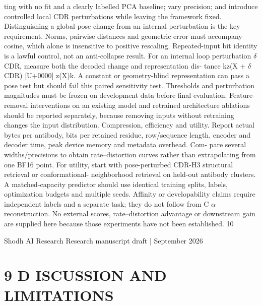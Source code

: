 \documentclass[11pt]{article}
\begin{document}
ting with no fit and a clearly labelled PCA baseline; vary precision; and introduce controlled local
CDR perturbations while leaving the framework fixed. Distinguishing a global pose change from
an internal perturbation is the key requirement. Norms, pairwise distances and geometric error must
accompany cosine, which alone is insensitive to positive rescaling. Repeated-input bit identity is a
lawful control, not an anti-collapse result.
For an internal loop perturbation \ensuremath{\delta}CDR, measure both the decoded change and representation dis-
tance kz(X + \ensuremath{\delta}CDR) [U+0000] z(X)k. A constant or geometry-blind representation can pass a pose test
but should fail this paired sensitivity test. Thresholds and perturbation magnitudes must be frozen
on development data before final evaluation. Feature-removal interventions on an existing model
and retrained architecture ablations should be reported separately, because removing inputs without
retraining changes the input distribution.
Compression, efficiency and utility. Report actual bytes per antibody, bits per retained residue,
row/sequence length, encoder and decoder time, peak device memory and metadata overhead. Com-
pare several widths/precisions to obtain rate–distortion curves rather than extrapolating from one
BF16 point. For utility, start with pose-perturbed CDR-H3 structural retrieval or conformational-
neighborhood retrieval on held-out antibody clusters. A matched-capacity predictor should use
identical training splits, labels, optimization budgets and multiple seeds. Affinity or developability
claims require independent labels and a separate task; they do not follow from C \ensuremath{\alpha} reconstruction.
No external scores, rate–distortion advantage or downstream gain are supplied here because those
experiments have not been established.
10

Shodh AI Research Research manuscript draft | September 2026

\section*{9 D ISCUSSION AND LIMITATIONS}
\end{document}
